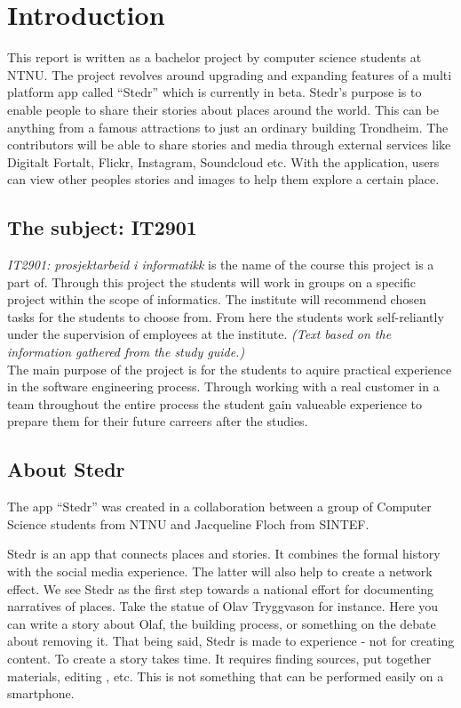 \section{Introduction}
\thispagestyle{plain}
	\setcounter{page}{1}


This report is written as a bachelor project by computer science students at NTNU. The project revolves around upgrading and expanding features of a multi platform app called “Stedr” which is currently in beta. Stedr's purpose is to enable people to share their stories about places around the world. This can be anything from a famous attractions to just an ordinary building Trondheim. The contributors will be able to share stories and media through external services like Digitalt Fortalt, Flickr, Instagram, Soundcloud etc. With the application, users can view other peoples stories and images  to help them explore a certain place.

\subsection{The subject: IT2901}
\emph{IT2901: prosjektarbeid i informatikk} is the name of the course this project is a part of. Through this project the students will work in groups on a specific project within the scope of informatics. The institute will recommend chosen tasks for the students to choose from. From here the students work self-reliantly under the supervision of employees at the institute. \textit{(Text based on the information gathered from the study guide.)}\\ The main purpose of the project is for the students to aquire practical experience in the software engineering process. Through working with a real customer in a team throughout the entire process the student gain valueable experience to prepare them for their future carreers after the studies.

\subsection{About Stedr}
The app “Stedr” was created in a collaboration between a group of Computer Science students from NTNU and Jacqueline Floch from SINTEF. 

Stedr is an app that connects places and stories. It combines the formal history with the social media experience. The latter will also help to create a network effect. 
We see Stedr as the first step towards a national effort for documenting narratives of places. Take the statue of Olav Tryggvason for instance. Here you can write a story about Olaf, the building process, or something on the debate about removing it. That being said, Stedr is made to experience - not for creating content. To create a story takes time. It requires finding sources, put together materials, editing , etc. This is not something that can be performed easily on a smartphone.

